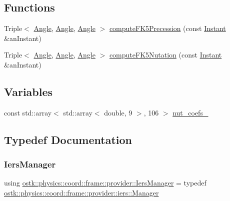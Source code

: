 \subsection*{Functions}
\begin{DoxyCompactItemize}
\item 
Triple$<$ \hyperlink{classostk_1_1physics_1_1units_1_1_angle}{Angle}, \hyperlink{classostk_1_1physics_1_1units_1_1_angle}{Angle}, \hyperlink{classostk_1_1physics_1_1units_1_1_angle}{Angle} $>$ \hyperlink{namespaceostk_1_1physics_1_1coord_1_1frame_1_1provider_acd9c9770d79be89d7c94517df77ebe27}{compute\+F\+K5\+Precession} (const \hyperlink{classostk_1_1physics_1_1time_1_1_instant}{Instant} \&an\+Instant)
\item 
Triple$<$ \hyperlink{classostk_1_1physics_1_1units_1_1_angle}{Angle}, \hyperlink{classostk_1_1physics_1_1units_1_1_angle}{Angle}, \hyperlink{classostk_1_1physics_1_1units_1_1_angle}{Angle} $>$ \hyperlink{namespaceostk_1_1physics_1_1coord_1_1frame_1_1provider_a0766714124629840ab0b3a909bc6e473}{compute\+F\+K5\+Nutation} (const \hyperlink{classostk_1_1physics_1_1time_1_1_instant}{Instant} \&an\+Instant)
\end{DoxyCompactItemize}
\subsection*{Variables}
\begin{DoxyCompactItemize}
\item 
const std\+::array$<$ std\+::array$<$ double, 9 $>$, 106 $>$ \hyperlink{namespaceostk_1_1physics_1_1coord_1_1frame_1_1provider_a73bcae3137799317545b837aa5693632}{nut\+\_\+coefs\+\_}
\end{DoxyCompactItemize}


\subsection{Typedef Documentation}
\mbox{\label{namespaceostk_1_1physics_1_1coord_1_1frame_1_1provider_a12fe12ec00381f0f866c1cb25df6b88f}} 
\subsubsection{\texorpdfstring{Iers\+Manager}{IersManager}}
{\footnotesize\ttfamily using \hyperlink{namespaceostk_1_1physics_1_1coord_1_1frame_1_1provider_a12fe12ec00381f0f866c1cb25df6b88f}{ostk\+::physics\+::coord\+::frame\+::provider\+::\+Iers\+Manager} = typedef \hyperlink{classostk_1_1physics_1_1coord_1_1frame_1_1provider_1_1iers_1_1_manager}{ostk\+::physics\+::coord\+::frame\+::provider\+::iers\+::\+Manager}}



